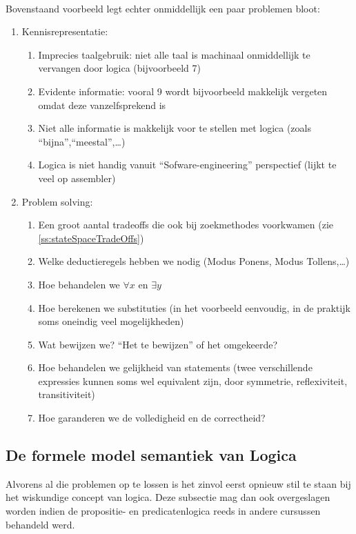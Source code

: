 \paragraph{}
Bovenstaand voorbeeld legt echter onmiddellijk een paar problemen bloot:
\begin{enumerate}
 \item Kennisrepresentatie:
\begin{enumerate}
 \item Imprecies taalgebruik: niet alle taal is machinaal onmiddellijk te vervangen door logica (bijvoorbeeld 7)
 \item Evidente informatie: vooral 9 wordt bijvoorbeeld makkelijk vergeten omdat deze vanzelfsprekend is
 \item Niet alle informatie is makkelijk voor te stellen met logica (zoals ``bijna'',``meestal'',\dots)
 \item Logica is niet handig vanuit ``Sofware-engineering'' perspectief (lijkt te veel op assembler)
\end{enumerate}
 \item Problem solving:
\begin{enumerate}
 \item Een groot aantal tradeoffs die ook bij zoekmethodes voorkwamen (zie \ref{ss:stateSpaceTradeOffs})
 \item Welke deductieregels hebben we nodig (Modus Ponens, Modus Tollens,\dots)
 \item Hoe behandelen we $\forall x$ en $\exists y$
 \item Hoe berekenen we substituties (in het voorbeeld eenvoudig, in de praktijk soms oneindig veel mogelijkheden)
 \item Wat bewijzen we? ``Het te bewijzen'' of het omgekeerde?
 \item Hoe behandelen we gelijkheid van statements (twee verschillende expressies kunnen soms wel equivalent zijn, door symmetrie, reflexiviteit, transitiviteit)
 \item Hoe garanderen we de volledigheid en de correctheid?
\end{enumerate}
\end{enumerate}
\subsection{De formele model semantiek van Logica}
Alvorens al die problemen op te lossen is het zinvol eerst opnieuw stil te staan bij het wiskundige concept van logica. Deze subsectie mag dan ook overgeslagen worden indien de propositie- en predicatenlogica reeds in andere cursussen behandeld werd.
